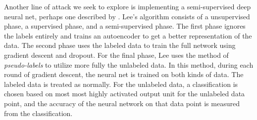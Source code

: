 \documentclass[11pt]{article}
\begin{document}
Another line of attack we seek to explore is implementing a semi-supervised deep neural net, perhaps one described by \cite{Lee:2013}. Lee's algorithm consists of a unsupervised phase, a supervised phase, and a semi-supervised phase. The first phase ignores the labels entirely and trains an autoencoder to get a better representation of the data. The second phase uses the labeled data to train the full network using gradient descent and dropout. For the final phase, Lee uses the method of \emph{pseudo-labels} to utilize more fully the unlabeled data. In this method, during each round of gradient descent, the neural net is trained on both kinds of data. The labeled data is treated as normally. For the unlabeled data, a classification is chosen based on most most highly activated output unit for the unlabeled data point, and the accuracy of the neural network on that data point is measured from the classification.



\end{document}
